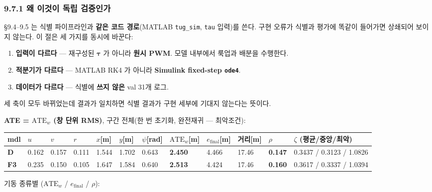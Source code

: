 \documentclass[10pt,a4paper]{article}
\begin{document}
\subsubsection*{9.7.1 왜 이것이 독립 검증인가}

\S{}9.4--9.5 는 식별 파이프라인과 \textbf{같은 코드 경로}(MATLAB \texttt{tug\_sim}, \texttt{tau} 입력)를 쓴다. 구현 오류가 식별과 평가에 똑같이 들어가면 상쇄되어 보이지 않는다. 이 절은 세 가지를 동시에 바꾼다:

\begin{enumerate}[leftmargin=1.5em,itemsep=2pt,parsep=2pt,topsep=3pt]
\item \textbf{입력이 다르다} --- 재구성된 $\boldsymbol{\tau}$ 가 아니라 \textbf{원시 PWM}. 모델 내부에서 룩업과 배분을 수행한다.
\item \textbf{적분기가 다르다} --- MATLAB RK4 가 아니라 \textbf{Simulink fixed-step \texttt{ode4}}.
\item \textbf{데이터가 다르다} --- 식별에 \textbf{쓰지 않은} val 31개 로그.
\end{enumerate}

세 축이 모두 바뀌었는데 결과가 일치하면 식별 결과가 구현 세부에 기대지 않는다는 뜻이다.

\textbf{ATE = $\mathrm{ATE}_w$ (창 단위 RMS)}, 구간 전체(한 번 초기화, 완전재귀 --- 최악조건):

\begin{center}\scriptsize\setlength{\tabcolsep}{3pt}
\begin{tabular}{@{}llllllllllll@{}}
\toprule
\textbf{mdl} & \textbf{$u$} & \textbf{$v$} & \textbf{$r$} & \textbf{$x$[m]} & \textbf{$y$[m]} & \textbf{$\psi$[rad]} & \textbf{$\mathrm{ATE}_w$[m]} & \textbf{$e_{\text{final}}$[m]} & \textbf{거리[m]} & \textbf{$\rho$} & \textbf{$\zeta$ (평균/중앙/최악)} \\
\midrule
\textbf{D} & 0.162 & 0.157 & 0.111 & 1.544 & 1.702 & 0.643 & \textbf{2.450} & 4.466 & 17.46 & \textbf{0.147} & 0.3437 / 0.3123 / 1.0826 \\
\textbf{F3} & 0.235 & 0.150 & 0.105 & 1.647 & 1.584 & 0.640 & \textbf{2.513} & 4.424 & 17.46 & \textbf{0.160} & 0.3617 / 0.3337 / 1.0394 \\
\bottomrule
\end{tabular}
\end{center}

기동 종류별 ($\mathrm{ATE}_w$ / $e_{\text{final}}$ / $\rho$):
\end{document}
